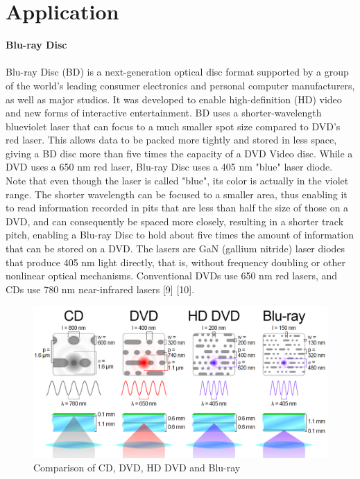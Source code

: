 \documentclass[a4paper,12pt]{report}
\begin{document}
\chapter{Application}
\textbf{Blu-ray Disc}\\\\
Blu-ray Disc (BD) is a next-generation optical disc format supported by a group of the
world's leading consumer electronics and personal computer manufacturers, as well as
major studios. It was developed to enable high-definition (HD) video and new forms of
interactive entertainment. BD uses a shorter-wavelength blueviolet
laser that can focus to a much
smaller spot size compared to DVD’s
red laser. This allows data to be
packed more tightly and stored in
less space, giving a BD disc more
than five times the capacity of a DVD
Video disc.
While a DVD uses a 650 nm red laser, Blu-ray Disc uses a 405 nm "blue" laser diode. Note that even though the laser is called "blue", its color is actually in the violet range. The shorter wavelength can be focused to a smaller area, thus enabling it to read information recorded in pits that are less than half the size of those on a DVD, and can consequently be spaced more closely, resulting in a shorter track pitch, enabling a Blu-ray Disc to hold about five times the amount of information that can be stored on a DVD. The lasers are GaN (gallium nitride) laser diodes that produce 405 nm light directly, that is, without frequency doubling or other nonlinear optical mechanisms. Conventional DVDs use 650 nm red lasers, and CDs use 780 nm near-infrared lasers [9] [10].
\begin{figure}[h!]
\centering
\includegraphics[width=0.6\linewidth, height=0.15\textheight]{blurat}
\caption{Comparison of CD, DVD, HD DVD and Blu-ray}
\label{fig:blurat}
\end{figure}
\end{document}
